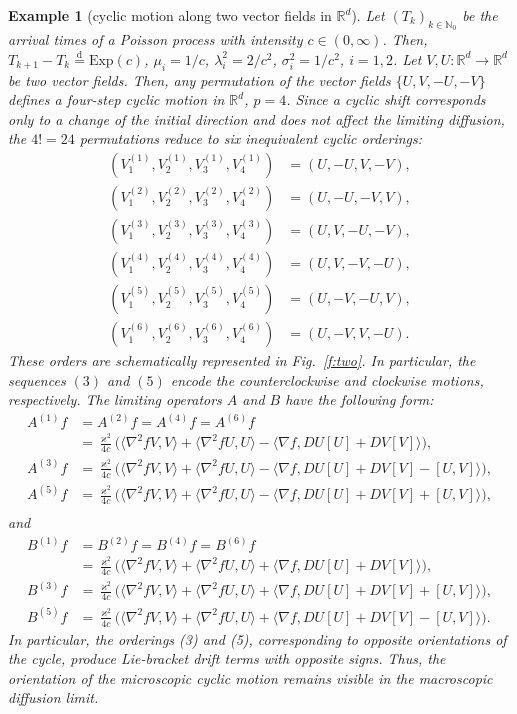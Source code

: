 \documentclass[10pt,a4paper]{amsart}
\newtheorem{exa}{Example}
\newcommand{\bR}{\mathbb{R}}
\newcommand{\ba}{\begin{equation}\begin{aligned}}
\newcommand{\di}{\mathrm{d}}
\newcommand{\ea}{\end{aligned}\end{equation}}
\begin{document}
\begin{exa}[cyclic motion along two vector fields in $\bR^d$]
\label{exa:UV}
Let $(T_k)_{k\in\mathbb N_0}$ be the arrival times of a Poisson process with intensity $c\in (0,\infty)$.
Then, $ T_{k+1}-T_k\stackrel{\di}{=} \mathrm{Exp}(c)$, $\mu_i=1/c$, $\lambda_i^2=2/c^2$,
$\sigma_i^2=1/c^2$, $i=1,2$.
Let $V,U\colon\bR^d\to\bR^d$ be two vector fields. Then, any permutation of the vector fields
$\{U,V,-U,-V\}$ defines a four-step cyclic motion in $\bR^d$, $p=4$.
Since a cyclic shift corresponds only to a change of the initial direction
and does not affect the limiting diffusion, the $4!=24$ permutations reduce
to six inequivalent cyclic orderings:
\ba
(V^{(1)}_1,V^{(1)}_2,V^{(1)}_3,V^{(1)}_4)&=(U, -U, V, -V),\\
(V^{(2)}_1,V^{(2)}_2,V^{(2)}_3,V^{(2)}_4)&=(U, -U, -V, V),\\
(V^{(3)}_1,V^{(3)}_2,V^{(3)}_3,V^{(3)}_4)&=(U, V, -U, -V),\\
(V^{(4)}_1,V^{(4)}_2,V^{(4)}_3,V^{(4)}_4)&=(U, V, -V, -U),\\
(V^{(5)}_1,V^{(5)}_2,V^{(5)}_3,V^{(5)}_4)&=(U, -V, -U, V),\\
(V^{(6)}_1,V^{(6)}_2,V^{(6)}_3,V^{(6)}_4)&=(U, -V, V, -U).
\ea
These orders are schematically represented in Fig.\ \ref{f:two}.
In particular, the sequences $(3)$ and $(5)$ encode the counterclockwise and clockwise motions, respectively.
The limiting operators $A$ and $B$ have the following form:
\ba
A^{(1)}f&=A^{(2)}f=A^{(4)}f =A^{(6)}f\\
&= \frac{\varkappa^2}{4c} \Big( \langle \nabla^2 f  V, V\rangle +\langle \nabla^2 f  U, U\rangle
- \langle \nabla f , D U [ U] + D V [ V]\rangle\Big),\\
A^{(3)}f&=\frac{\varkappa^2}{4c} \Big(
\langle \nabla^2 f  V, V\rangle +\langle \nabla^2 f  U, U\rangle
- \langle \nabla f , D U [ U] + D V [ V] -[U,V] \rangle\Big),\\
A^{(5)}f&=\frac{\varkappa^2}{4c} \Big(
\langle \nabla^2 f  V, V\rangle +\langle \nabla^2 f  U, U\rangle
- \langle \nabla f , D U [ U] + D V [ V] +[U,V] \rangle\Big),\\
\ea
and
\ba
B^{(1)}f&=B^{(2)}f=B^{(4)}f =B^{(6)}f\\
&= \frac{\varkappa^2}{4c} \Big( \langle \nabla^2 f  V, V\rangle +\langle \nabla^2 f  U, U\rangle
+\langle \nabla f , D U [ U] + D V [ V]\rangle\Big),\\
B^{(3)}f&=\frac{\varkappa^2}{4c} \Big( \langle \nabla^2 f  V, V\rangle +\langle \nabla^2 f  U, U\rangle
+\langle \nabla f , D U [ U] + D V [ V] +[U,V]\rangle\Big),\\
B^{(5)}f
&= \frac{\varkappa^2}{4c} \Big( \langle \nabla^2 f  V, V\rangle +\langle \nabla^2 f  U, U\rangle
+ \langle \nabla f , D U [ U] + D V [ V]-[U,V]\rangle
\Big).
\ea
In particular, the orderings (3) and (5), corresponding to opposite orientations of the cycle,
produce Lie-bracket drift terms with opposite signs.
Thus, the orientation of the microscopic cyclic motion remains visible in the macroscopic diffusion limit.


\end{exa}
\end{document}
